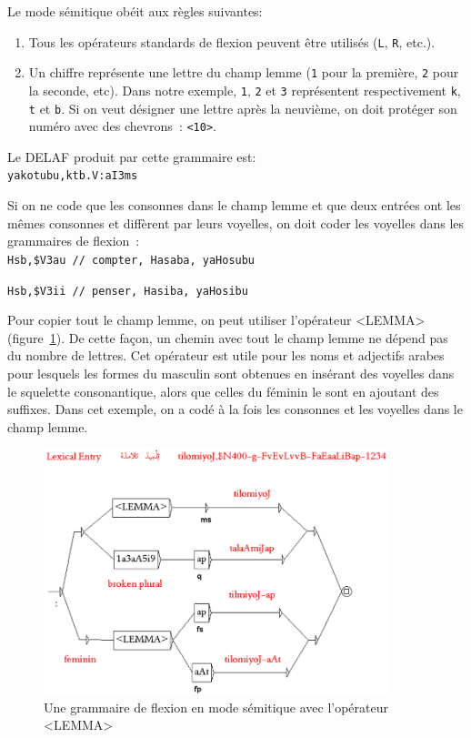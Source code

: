 \bigskip
\noindent Le mode sémitique obéit aux règles suivantes:
\begin{enumerate}
\item Tous les opérateurs standards de flexion peuvent être utilisés (\verb+L+, \verb+R+, etc.).
\item Un chiffre représente une lettre du champ lemme (\verb+1+ pour la première,
\verb+2+ pour la seconde, etc). Dans notre exemple, \verb+1+, \verb+2+ et \verb+3+ représentent
respectivement \verb+k+, \verb+t+ et \verb+b+. Si on veut désigner une lettre après la neuvième,
on doit protéger son numéro avec des chevrons~: \verb+<10>+.
\end{enumerate}  

\bigskip
\noindent Le DELAF produit par cette grammaire est:\\ 
  
\verb+yakotubu,ktb.V:aI3ms+

\bigskip
\noindent Si on ne code que les consonnes dans le champ lemme et que deux entrées ont les mêmes consonnes et diffèrent par leurs voyelles, on doit coder les voyelles dans les grammaires de flexion~:\\ 

\verb+Hsb,$V3au	// compter, Hasaba, yaHosubu+

\verb+Hsb,$V3ii	// penser, Hasiba, yaHosibu+

\bigskip
\noindent Pour copier tout le champ lemme, on peut utiliser l'opérateur <LEMMA> (figure~\ref{LEMMA-operator}). De cette façon, un chemin avec tout le champ lemme ne dépend pas du nombre de lettres.
Cet opérateur est utile pour les noms et adjectifs arabes pour lesquels les formes du masculin sont obtenues en
insérant des voyelles dans le squelette consonantique, alors que celles du féminin le sont en ajoutant des
suffixes. Dans cet exemple, on a codé à la fois les consonnes et les voyelles dans le champ lemme.

\begin{figure}[!ht]
\begin{center}
\includegraphics[width=10cm]{resources/img/fig3-LEMMA-operator.png}
\caption{Une grammaire de flexion en mode sémitique avec l'opérateur <LEMMA>\label{LEMMA-operator}}
\end{center}
\end{figure}

